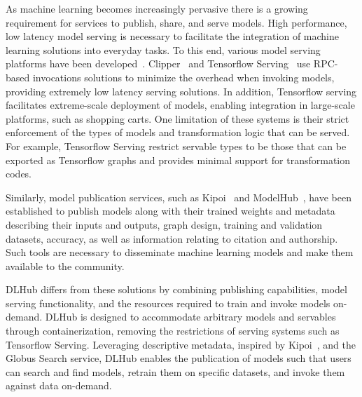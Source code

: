 \documentclass{aip-cp}
\newcommand\ian[1]{}
\newcommand\ryan[1]{}
\newcommand\ian[1]{{\color{red}[Ian: #1]}}
\newcommand\ryan[1]{{\color{green}[Ryan: #1]}}
\begin{document}
\ian{Reference ModelHub~\cite{miao2017towards}. Velox for rapid model 
serving~\cite{crankshaw2014missing}. and~\cite{kumar2017data}}

\ryan{DLHub RW?}

As machine learning becomes 
increasingly pervasive there is a growing requirement for services to publish, share, and serve 
models. High performance, low latency 
model serving is necessary to facilitate the integration of machine learning solutions into 
everyday tasks. To this end, various model serving platforms have been 
developed~\cite{crankshaw2017clipper, tfserving, awssagemaker}. Clipper~\cite{crankshaw2017clipper} and 
Tensorflow Serving~\cite{tfserving} use RPC-based invocations solutions to minimize the overhead 
when invoking models, providing extremely low latency serving solutions. In addition, Tensorflow 
serving facilitates extreme-scale deployment of models, enabling integration in large-scale 
platforms, such as shopping carts. One limitation of these systems is their strict enforcement of 
the types of models and transformation logic that can be served. For example, Tensorflow Serving 
restrict servable types to be those that can be exported as Tensorflow graphs and provides minimal 
support for transformation codes.

\ryan{I haven't read the modelhub paper -- not entirely sure this usage is accurate}
Similarly, model publication services, such as Kipoi~\cite{kipoi} and 
ModelHub~\cite{miao2017towards}, have been established to publish models along with their trained 
weights and metadata describing their inputs and outputs, graph design, training and 
validation datasets, accuracy, as well as information relating to citation and authorship. Such 
tools are necessary to disseminate machine learning models and make them available to the 
community.

DLHub differs from these solutions by combining publishing capabilities, model serving 
functionality, and the resources required to train and invoke models on-demand. DLHub is designed 
to accommodate arbitrary models and servables through containerization, removing the restrictions 
of serving systems such as Tensorflow Serving. Leveraging descriptive metadata, inspired by 
Kipoi~\cite{kipoi}, and the Globus Search service, DLHub enables the publication of models such 
that users can search and find models, retrain them on specific datasets, and invoke them against 
data on-demand. 
\end{document}
